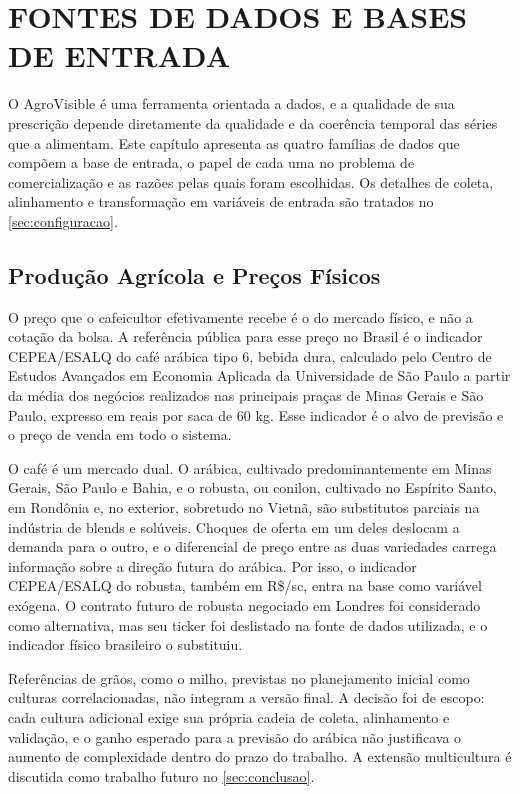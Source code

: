 \chapter{\MakeUppercase{Fontes de Dados e Bases de Entrada}}\label{sec:fontes}

O AgroVisible é uma ferramenta orientada a dados, e a qualidade de sua prescrição depende diretamente da qualidade e da coerência temporal das séries que a alimentam. Este capítulo apresenta as quatro famílias de dados que compõem a base de entrada, o papel de cada uma no problema de comercialização e as razões pelas quais foram escolhidas. Os detalhes de coleta, alinhamento e transformação em variáveis de entrada são tratados no \autoref{sec:configuracao}.

\section{Produção Agrícola e Preços Físicos}\label{sec2:fontes-fisico}

O preço que o cafeicultor efetivamente recebe é o do mercado físico, e não a cotação da bolsa. A referência pública para esse preço no Brasil é o indicador CEPEA/ESALQ do café arábica tipo 6, bebida dura, calculado pelo Centro de Estudos Avançados em Economia Aplicada da Universidade de São Paulo a partir da média dos negócios realizados nas principais praças de Minas Gerais e São Paulo, expresso em reais por saca de 60 kg. Esse indicador é o alvo de previsão e o preço de venda em todo o sistema.

O café é um mercado dual. O arábica, cultivado predominantemente em Minas Gerais, São Paulo e Bahia, e o robusta, ou conilon, cultivado no Espírito Santo, em Rondônia e, no exterior, sobretudo no Vietnã, são substitutos parciais na indústria de blends e solúveis. Choques de oferta em um deles deslocam a demanda para o outro, e o diferencial de preço entre as duas variedades carrega informação sobre a direção futura do arábica. Por isso, o indicador CEPEA/ESALQ do robusta, também em R\$/sc, entra na base como variável exógena. O contrato futuro de robusta negociado em Londres foi considerado como alternativa, mas seu ticker foi deslistado na fonte de dados utilizada, e o indicador físico brasileiro o substituiu.

Referências de grãos, como o milho, previstas no planejamento inicial como culturas correlacionadas, não integram a versão final. A decisão foi de escopo: cada cultura adicional exige sua própria cadeia de coleta, alinhamento e validação, e o ganho esperado para a previsão do arábica não justificava o aumento de complexidade dentro do prazo do trabalho. A extensão multicultura é discutida como trabalho futuro no \autoref{sec:conclusao}.

